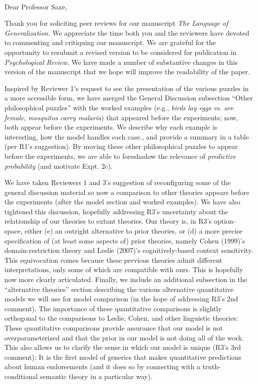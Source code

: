 \documentclass[11pt,letterpaper]{letter} %
\def\opening#1{\thispagestyle{empty}
{\centering\fromaddress \vspace{0.6in} \\ %
\hspace*{\longindentation}\hspace*{\fill}\par} %
\vspace{0.4in} %
\noindent #1 %
}
\begin{document}
\begin{letter}

\opening{Dear Professor Saxe,}

Thank you for soliciting peer reviews for our manuscript \emph{The Language of Generalization}. We appreciate the time both you and the reviewers have devoted to commenting and critiquing our manuscript. We are grateful for the opportunity to resubmit a revised version to be considered for publication in \emph{Psychological Review}.
We have made a number of substantive changes in this version of the manuscript that we hope will improve the readability of the paper.

Inspired by Reviewer 1's request to see the presentation of the various puzzles in a more accessible form,
we have merged the General Discussion subsection ``Other philosophical puzzles'' with the worked examples (e.g., \emph{birds lay eggs vs. are female}, \emph{mosquitos carry malaria}) that appeared before the experiments; now, both appear before the experiments.
We describe why each example is interesting, how the model handles each case., and provide a summary in a table (per R1's suggestion).
By moving these other philosophical puzzles to appear before the experiments, we are able to foreshadow the relevance of \emph{predictive probability} (and motivate Expt. 2c).

We have taken Reviewers 1 and 3's suggestion of reconfiguring some of the general discussion material so now a comparison to other theories appears before the experiments (after the model section and worked examples).
We have also tightened this discussion, hopefully addressing R3's uncertainty about the relationship of our theories to extant theories. 
Our theory is, in R3's option-space, either (e) an outright alternative to prior theories, or (d) a more precise specification of (at least some aspects of) prior theories, namely Cohen (1999)'s domain-restriction theory and Leslie (2007)'s cognitively-based context sensitivity.
This equivocation comes because these previous theories admit different interpretations, only some of which are compatible with ours.
This is hopefully now more clearly articulated.
Finally, we include an additional subsection in the ``alternative theories'' section describing the various alternative quantitative models we will use for model comparison (in the hope of addressing R3's 2nd comment). 
The importance of these quantitative comparisons is slightly orthogonal to the comparisons to Leslie, Cohen, and other linguistic theories: These quantitative comparisons provide assurance that our model is not overparameterized and that the prior in our model is not doing all of the work. 
This also allows us to clarify the sense in which our model is unique (R3's 3rd comment): It is the first model of generics that makes quantitative predictions about human endorsements (and it does so by connecting with a truth-conditional semantic theory in a particular way). 


\end{letter}
\end{document}

